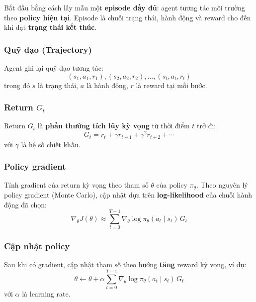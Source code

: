 \begin{phuongphap}[title={Bước 1 --- Lấy mẫu episode}]
Bắt đầu bằng cách lấy mẫu một \textbf{episode đầy đủ}: agent tương tác môi trường theo \textbf{policy hiện tại}.
Episode là chuỗi trạng thái, hành động và reward cho đến khi đạt \textbf{trạng thái kết thúc}.
\end{phuongphap}

\subsubsection{Quỹ đạo (Trajectory)}

\begin{phuongphap}[title={Bước 2 --- Ghi quỹ đạo}]
Agent ghi lại quỹ đạo tương tác:
\[
(s_1, a_1, r_1), (s_2, a_2, r_2), \ldots, (s_t, a_t, r_t)
\]
trong đó $s$ là trạng thái, $a$ là hành động, $r$ là reward tại mỗi bước.
\end{phuongphap}

\subsubsection{Return $G_t$}

\begin{phuongphap}[title={Bước 3 --- Tính return}]
Return $G_t$ là \textbf{phần thưởng tích lũy kỳ vọng} từ thời điểm $t$ trở đi:
\[
G_t = r_t + \gamma r_{t+1} + \gamma^2 r_{t+2} + \cdots
\]
với $\gamma$ là hệ số chiết khấu.
\end{phuongphap}

\subsubsection{Policy gradient}

\begin{phuongphap}[title={Bước 4 --- Gradient của return kỳ vọng}]
Tính gradient của return kỳ vọng theo tham số $\theta$ của policy $\pi_\theta$.
Theo nguyên lý policy gradient (Monte Carlo), cập nhật dựa trên \textbf{log-likelihood} của chuỗi hành động đã chọn:
\[
\nabla_\theta J(\theta) \approx \sum_{t=0}^{T-1} \nabla_\theta \log \pi_\theta(a_t \mid s_t)\, G_t
\]
\end{phuongphap}

\subsubsection{Cập nhật policy}

\begin{phuongphap}[title={Bước 5 --- Cập nhật tham số policy}]
Sau khi có gradient, cập nhật tham số theo hướng \textbf{tăng} reward kỳ vọng, ví dụ:
\[
\theta \leftarrow \theta + \alpha \sum_{t=0}^{T-1} \nabla_\theta \log \pi_\theta(a_t \mid s_t)\, G_t
\]
với $\alpha$ là learning rate.
\end{phuongphap}

